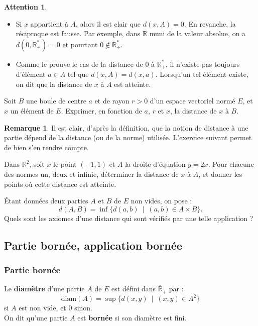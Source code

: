 \documentclass[french]{article}
\newcommand{\R}{\mathbb{R}}
\newcommand{\st}{^*}
\theoremstyle{plain}
\theoremstyle{definition}
\newtheorem*{rmq}{Remarque}
\newtheorem*{attention}{Attention}
\theoremstyle{remark}
\begin{document}
\begin{attention}
\begin{itemize}
	\item Si $x$ appartient à $A$, alors il est clair que $d(x,A)=0$. En revanche, la réciproque est fausse. Par exemple, dans $\R$ muni de la valeur absolue, on a $d(0,\R_+\st)=0$ et pourtant $0\notin\R_+\st$.
	\item Comme le prouve le cas de la distance de $0$ à $\R_+\st$, il n'existe pas toujours d'élément $a\in A$ tel que $d(x,A)=d(x,a)$. Lorsqu'un tel élément existe, on dit que la distance de $x$ à $A$ est atteinte.
\end{itemize}
\end{attention}

\begin{exo}
	Soit $B$ une boule de centre $a$ et de rayon $r>0$ d'un espace vectoriel normé $E$, et $x$ un élément de $E$. Exprimer, en fonction de $a$, $r$ et $x$, la distance de $x$ à $B$.
\end{exo}

\begin{rmq}
	Il est clair, d'après la définition, que la notion de distance à une partie dépend de la distance (ou de la norme) utilisée. L'exercice suivant permet de bien s'en rendre compte.
\end{rmq}

\begin{exo}
	Dans $\R^2$, soit $x$ le point $(-1,1)$ et $A$ la droite d'équation $y=2x$. Pour chacune des normes un, deux et infinie, déterminer la distance de $x$ à $A$, et donner les points où cette distance est atteinte.
\end{exo}

\begin{exo}
	Étant données deux parties $A$ et $B$ de $E$ non vides, on pose : $$d(A,B)=\inf\{d(a,b)\ \mid\ (a,b)\in A\times B\}.$$ Quels sont les axiomes d'une distance qui sont vérifiés par une telle application ?
\end{exo}

\subsection{Partie bornée, application bornée}

\subsubsection*{Partie bornée}

\begin{dfn}
	Le \textbf{diamètre} d'une partie $A$ de $E$ est défini dans $\overline{\R}_+$ par : $$\text{diam}(A)=\sup\{d(x,y)\ \mid\ (x,y)\in A^2\}$$ si $A$ est non vide, et $0$ sinon.\\
	On dit qu'une partie $A$ est \textbf{bornée} si son diamètre est fini.
\end{dfn}
\end{document}

